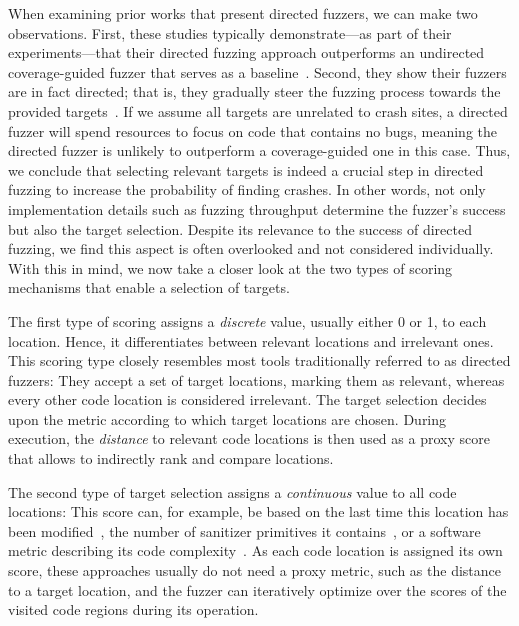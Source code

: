 \cstart
{}
When examining prior works that present directed fuzzers, we can make two observations. First, these studies typically demonstrate---as part of their experiments---that their directed fuzzing approach outperforms an undirected coverage-guided fuzzer that serves as a baseline~\cite{BoePhaNguRoy17, CheXueLiChe+18, WüsChr20, NguBarBonGro+20, AscSchAbbHol+20, ZhaLiuYaoJin+23}. Second, they show their fuzzers are in fact directed; that is, they gradually steer the fuzzing process towards the provided targets~\cite{BoePhaNguRoy17, CheXueLiChe+18, WüsChr20}. 
%
If we assume all targets are unrelated to crash sites, a directed fuzzer will spend resources to focus on code that contains no bugs, meaning the directed fuzzer is unlikely to outperform a coverage-guided one in this case.
%
Thus, we conclude that selecting relevant targets is indeed a crucial step in directed fuzzing to increase the probability of finding crashes.
%
In other words, not only implementation details such as fuzzing throughput determine the fuzzer's success but also the target selection. Despite its relevance to the success of directed fuzzing, we find this aspect is often overlooked and not considered individually.
%
With this in mind, we now take a closer look at the two types of scoring mechanisms that enable a selection of targets.

\cend

The first type of scoring assigns a \emph{discrete} value, usually either 0 or 1, to each location. Hence, it differentiates between relevant locations and irrelevant ones. This scoring type closely resembles most tools traditionally referred to as directed fuzzers: They accept a set of target locations, marking them as relevant, whereas every other code location is considered irrelevant. The target selection decides upon the metric according to which target locations are chosen. During execution, the \emph{distance} to relevant code locations is then used as a proxy score that allows to indirectly rank and compare locations.

The second type of target selection assigns a \emph{continuous} value to all code locations: This score can, for example, be based on the last time this location has been modified~\citep{ZhuBöh21}, the number of sanitizer primitives it contains~\citep{OstRazBosGiu+20}, or a software metric describing its code complexity~\citep{DuCheLiGuo+19}. As each code location is assigned its own score, these approaches usually do not need a proxy metric, such as the distance to a target location, and the fuzzer can iteratively optimize over the scores of the visited code regions during its operation.



